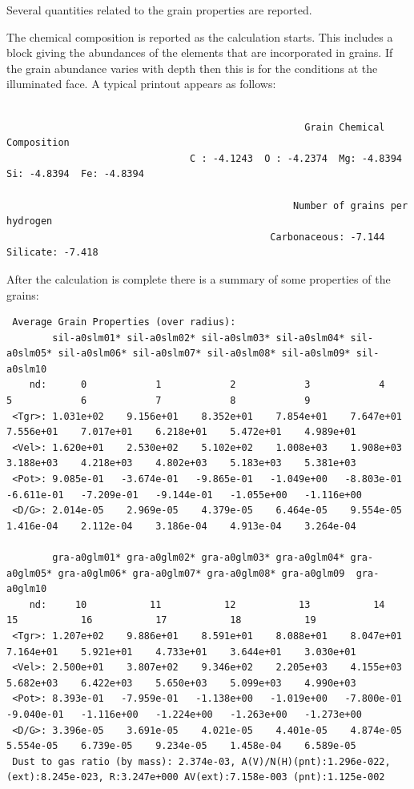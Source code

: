 Several quantities related to the grain properties are reported.

The chemical composition is reported as the calculation starts.  This includes a block giving the abundances of the elements that are incorporated in grains.
If the grain abundance varies with depth then this is for the conditions
at the illuminated face.
A typical printout appears as follows:

{\setverbatimfontsize{\tiny}
\begin{verbatim}

                                                    Grain Chemical Composition
                                C : -4.1243  O : -4.2374  Mg: -4.8394  Si: -4.8394  Fe: -4.8394

                                                  Number of grains per hydrogen
                                              Carbonaceous: -7.144  Silicate: -7.418
\end{verbatim}
}

After the calculation is complete there is a summary of some properties
of the grains:
{\setverbatimfontsize{\tiny}
\begin{verbatim}
 Average Grain Properties (over radius):
        sil-a0slm01* sil-a0slm02* sil-a0slm03* sil-a0slm04* sil-a0slm05* sil-a0slm06* sil-a0slm07* sil-a0slm08* sil-a0slm09* sil-a0slm10
    nd:      0            1            2            3            4            5            6            7            8            9
 <Tgr>: 1.031e+02    9.156e+01    8.352e+01    7.854e+01    7.647e+01    7.556e+01    7.017e+01    6.218e+01    5.472e+01    4.989e+01
 <Vel>: 1.620e+01    2.530e+02    5.102e+02    1.008e+03    1.908e+03    3.188e+03    4.218e+03    4.802e+03    5.183e+03    5.381e+03
 <Pot>: 9.085e-01   -3.674e-01   -9.865e-01   -1.049e+00   -8.803e-01   -6.611e-01   -7.209e-01   -9.144e-01   -1.055e+00   -1.116e+00
 <D/G>: 2.014e-05    2.969e-05    4.379e-05    6.464e-05    9.554e-05    1.416e-04    2.112e-04    3.186e-04    4.913e-04    3.264e-04

        gra-a0glm01* gra-a0glm02* gra-a0glm03* gra-a0glm04* gra-a0glm05* gra-a0glm06* gra-a0glm07* gra-a0glm08* gra-a0glm09  gra-a0glm10
    nd:     10           11           12           13           14           15           16           17           18           19
 <Tgr>: 1.207e+02    9.886e+01    8.591e+01    8.088e+01    8.047e+01    7.164e+01    5.921e+01    4.733e+01    3.644e+01    3.030e+01
 <Vel>: 2.500e+01    3.807e+02    9.346e+02    2.205e+03    4.155e+03    5.682e+03    6.422e+03    5.650e+03    5.099e+03    4.990e+03
 <Pot>: 8.393e-01   -7.959e-01   -1.138e+00   -1.019e+00   -7.800e-01   -9.040e-01   -1.116e+00   -1.224e+00   -1.263e+00   -1.273e+00
 <D/G>: 3.396e-05    3.691e-05    4.021e-05    4.401e-05    4.874e-05    5.554e-05    6.739e-05    9.234e-05    1.458e-04    6.589e-05
 Dust to gas ratio (by mass): 2.374e-03, A(V)/N(H)(pnt):1.296e-022, (ext):8.245e-023, R:3.247e+000 AV(ext):7.158e-003 (pnt):1.125e-002
\end{verbatim}
}

